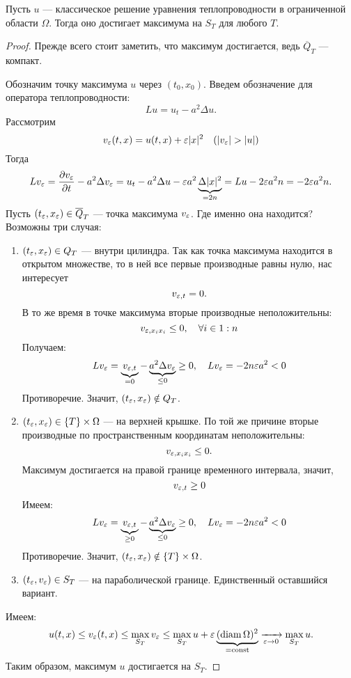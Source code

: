 \begin{theorem}

Пусть $u$ --- классическое решение уравнения теплопроводности в ограниченной области $\Omega$. Тогда оно достигает максимума на $S_T$ для любого $T$.
\end{theorem}
\begin{proof}
Прежде всего стоит заметить, что максимум достигается, ведь $\overline{Q}_T$ --- компакт.

Обозначим точку максимума $u$ через $(t_0, x_0)$. Введем обозначение для оператора теплопроводности:
$$ Lu  = u_t - a^2 \Delta u.$$
Рассмотрим 
$$ v_{\eps} (t,x) = u(t,x) + \eps \abs{x}^2 \quad (\abs{v_{\eps}} > \abs{u})$$
Тогда
$$ L v_{\eps} = \pder[v_{\eps}]{t} - a^2 \Delta v_{\eps} = u_t - a^2 \Delta u - \eps a^2 \underbrace{\Delta \abs{x}^2}_{=2n} = Lu - 2 \eps a^2 n = - 2 \eps a^2 n.$$
Пусть $(t_{\eps}, x_{\eps}) \in \overline{Q}_T$ --- точка максимума $v_{\eps}$. Где именно она находится? Возможны три случая:

\begin{enumerate}
\item $(t_{\eps}, x_{\eps}) \in Q_T$ --- внутри цилиндра. Так как точка максимума находится в открытом множестве, то в ней все первые производные равны нулю, нас интересует $$v_{\eps, t} = 0.$$
В то же время в точке максимума вторые производные неположительны: $$ v_{\eps, x_i x_i} \leq 0, \quad \forall i \in 1:n $$
Получаем:
$$Lv_{\eps}  = \underbrace {v_{\eps,t}}_{=0} - \underbrace {a^2 \Delta v_{\eps}}_{\leq 0} \geq 0, \quad L v_{\eps} = -2n \eps a^2 < 0$$
Противоречие. Значит, $(t_{\eps}, x_{\eps}) \notin Q_T$.
\item $(t_{\eps}, x_{\eps}) \in \left\{ T \right\} \times \Omega$ --- на верхней крышке. По той же причине вторые производные по пространственным координатам неположительны:
$$ v_{\eps, x_i x_i} \leq 0.$$
Максимум достигается на правой границе временного интервала, значит,
$$v_{\eps,t} \geq 0$$
Имеем:
$$Lv_{\eps}  = \underbrace {v_{\eps,t}}_{\geq 0} - \underbrace {a^2 \Delta v_{\eps}}_{\leq 0} \geq 0, \quad L v_{\eps} = -2n \eps a^2 < 0$$
Противоречие. Значит, $(t_{\eps}, x_{\eps}) \notin \left\{ T \right\} \times \Omega$.
\item $(t_{\eps}, v_{\eps}) \in S_T$ --- на параболической границе. Единственный оставшийся вариант.
\end{enumerate}
Имеем:
$$ u(t,x) \leq v_{\eps} (t,x) \leq \max_{S_T} v_{\eps} \leq \max_{S_T} u + \eps \underbrace {(\diam \Omega)^2}_{=\const} \xrightarrow[\eps \to 0]{} \max_{S_T} u.$$
Таким образом, максимум $u$ достигается на $S_T$.

\end{proof}

